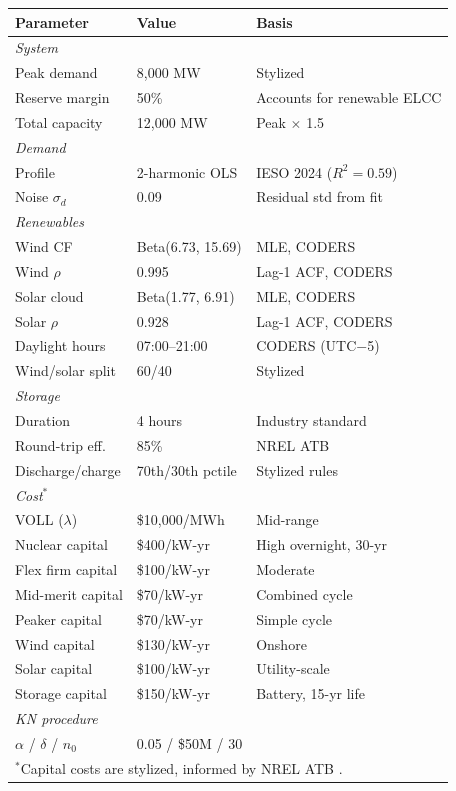 \documentclass[11pt]{article}
\begin{document}
\begin{tabular}{lll}
\toprule
Parameter & Value & Basis \\
\midrule
\multicolumn{3}{l}{\textit{System}} \\
Peak demand & 8,000 MW & Stylized \\
Reserve margin & 50\% & Accounts for renewable ELCC \\
Total capacity & 12,000 MW & Peak $\times$ 1.5 \\
\midrule
\multicolumn{3}{l}{\textit{Demand}} \\
Profile & 2-harmonic OLS & IESO 2024 \citep{IESO2025} ($R^2 = 0.59$) \\
Noise $\sigma_d$ & 0.09 & Residual std from fit \\
\midrule
\multicolumn{3}{l}{\textit{Renewables}} \\
Wind CF & Beta(6.73, 15.69) & MLE, CODERS \citep{CODERS2025} \\
Wind $\rho$ & 0.995 & Lag-1 ACF, CODERS \\
Solar cloud & Beta(1.77, 6.91) & MLE, CODERS \\
Solar $\rho$ & 0.928 & Lag-1 ACF, CODERS \\
Daylight hours & 07:00--21:00 & CODERS (UTC$-$5) \\
Wind/solar split & 60/40 & Stylized \\
\midrule
\multicolumn{3}{l}{\textit{Storage}} \\
Duration & 4 hours & Industry standard \\
Round-trip eff.\ & 85\% & NREL ATB \citep{NRELATB2023} \\
Discharge/charge & 70th/30th pctile & Stylized rules \\
\midrule
\multicolumn{3}{l}{\textit{Cost}$^*$} \\
VOLL ($\lambda$) & \$10,000/MWh & Mid-range \\
Nuclear capital & \$400/kW-yr & High overnight, 30-yr \\
Flex firm capital & \$100/kW-yr & Moderate \\
Mid-merit capital & \$70/kW-yr & Combined cycle \\
Peaker capital & \$70/kW-yr & Simple cycle \\
Wind capital & \$130/kW-yr & Onshore \\
Solar capital & \$100/kW-yr & Utility-scale \\
Storage capital & \$150/kW-yr & Battery, 15-yr life \\
\midrule
\multicolumn{3}{l}{\textit{KN procedure}} \\
$\alpha$ / $\delta$ / $n_0$ & 0.05 / \$50M / 30 & \\
\bottomrule
\multicolumn{3}{l}{\footnotesize $^*$Capital costs are stylized, informed by NREL ATB \citep{NRELATB2023}.} \\
\end{tabular}
\end{document}
